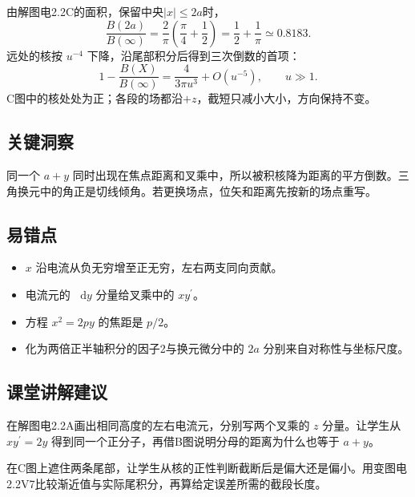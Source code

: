 \documentclass[UTF8,fontset=fandol,a4paper,11pt]{ctexart}
\newcommand{\dd}{\mathop{}\!\mathrm{d}}
\begin{document}
由解图电2.2C的面积，保留中央$|x|\le2a$时，
\[
\frac{B(2a)}{B(\infty)}
=\frac2\pi\left(\frac\pi4+\frac12\right)
=\frac12+\frac1\pi\simeq0.8183.
\]
远处的核按 $u^{-4}$ 下降，沿尾部积分后得到三次倒数的首项：
\[
1-\frac{B(X)}{B(\infty)}
=\frac4{3\pi u^3}+O(u^{-5}),\qquad u\gg1.
\]
C图中的核处处为正；各段的场都沿$+z$，截短只减小大小，方向保持不变。



\subsection*{关键洞察}

同一个 $a+y$ 同时出现在焦点距离和叉乘中，所以被积核降为距离的平方倒数。三角换元中的角正是切线倾角。若更换场点，位矢和距离先按新的场点重写。



\subsection*{易错点}

\begin{itemize}
\item $x$ 沿电流从负无穷增至正无穷，左右两支同向贡献。
\item 电流元的 $\dd y$ 分量给叉乘中的 $xy^\prime$。
\item 方程 $x^2=2py$ 的焦距是 $p/2$。
\item 化为两倍正半轴积分的因子2与换元微分中的 $2a$ 分别来自对称性与坐标尺度。
\end{itemize}



\subsection*{课堂讲解建议}

在解图电2.2A画出相同高度的左右电流元，分别写两个叉乘的 $z$ 分量。让学生从 $xy^\prime=2y$ 得到同一个正分子，再借B图说明分母的距离为什么也等于 $a+y$。

在C图上遮住两条尾部，让学生从核的正性判断截断后是偏大还是偏小。用变图电2.2V7比较渐近值与实际尾积分，再算给定误差所需的截段长度。

\end{document}

